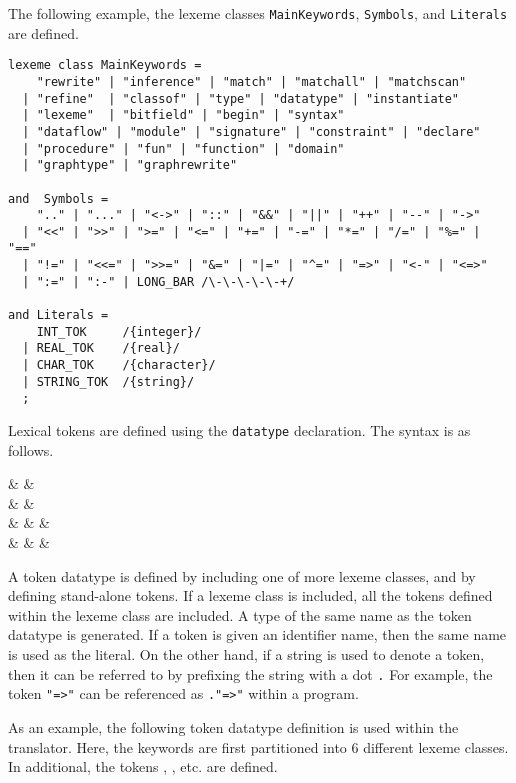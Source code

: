 The following example,
the lexeme classes \verb|MainKeywords|, \verb|Symbols|, and \verb|Literals| 
are defined.  
\begin{verbatim}
lexeme class MainKeywords =
    "rewrite" | "inference" | "match" | "matchall" | "matchscan"
  | "refine"  | "classof" | "type" | "datatype" | "instantiate"
  | "lexeme"  | "bitfield" | "begin" | "syntax"
  | "dataflow" | "module" | "signature" | "constraint" | "declare"
  | "procedure" | "fun" | "function" | "domain" 
  | "graphtype" | "graphrewrite"

and  Symbols =
    ".." | "..." | "<->" | "::" | "&&" | "||" | "++" | "--" | "->" 
  | "<<" | ">>" | ">=" | "<=" | "+=" | "-=" | "*=" | "/=" | "%=" | "==" 
  | "!=" | "<<=" | ">>=" | "&=" | "|=" | "^=" | "=>" | "<-" | "<=>"
  | ":=" | ":-" | LONG_BAR /\-\-\-\-\-+/

and Literals =
    INT_TOK     /{integer}/
  | REAL_TOK    /{real}/
  | CHAR_TOK    /{character}/
  | STRING_TOK  /{string}/
  ;
\end{verbatim}


Lexical tokens are defined using the \verb|datatype| declaration. 
The syntax is as follows.
\begin{syntax}
   & \IS &  \Id \T{::}  \T{=} \\
      & & \quad {} \T{;} \\
   & \IS &  \Id & 
        \\
                  & \OR & \Id {}  &
        \\
\end{syntax}

A token datatype is defined by including one of more lexeme classes,
and by defining stand-alone tokens.  If a lexeme class is included,
all the tokens defined within the lexeme class are included.  A \Cpp{}
 type of the same name as the token datatype is generated.
If a token is given an identifier name, then the same name is used
as the  literal.  On the other hand, if a string is used
to denote a token, then it can be referred to by prefixing the
string with a dot \verb|.|  For example, the token \verb|"=>"| can
be referenced as \verb|."=>"| within a program.

As an example, the following token datatype definition is used within
the \Prop{} translator.  Here, the keywords are first partitioned into
6 different lexeme classes.  In additional, the tokens ,
, etc. are defined.

